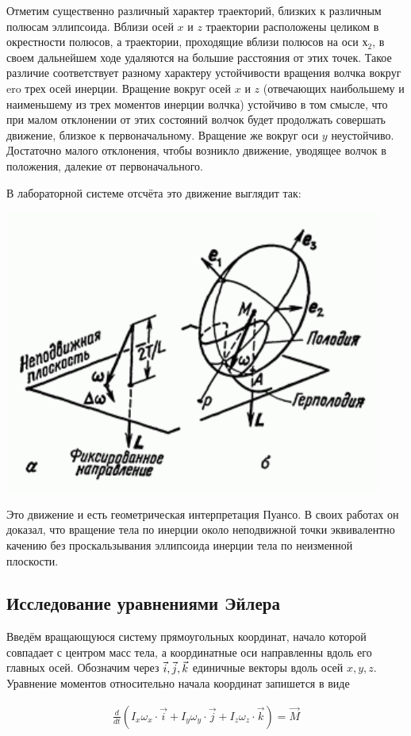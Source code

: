 \documentclass{article}
\begin{document}
Отметим существенно различный характер траекторий, близких к различным полюсам эллипсоида. Вблизи осей $x$ и $z$ траектории расположены целиком в окрестности полюсов, а траектории, проходящие вблизи полюсов на оси $х_2$, в своем дальнейшем ходе удаляются на большие расстояния от этих точек. Такое различие соответствует разному  характеру устойчивости вращения волчка вокруг ero трех осей инерции. Вращение вокруг осей $x$ и $z$ (отвечающих наибольшему и наименьшему из трех моментов инерции волчка) устойчиво в том смысле, что при малом отклонении от этих состояний волчок будет продолжать совершать движение, близкое к первоначальному. Вращение же вокруг оси $y$ неустойчиво. Достаточно малого отклонения, чтобы возникло движение, уводящее волчок в положения, далекие от первоначального.

В лабораторной системе отсчёта это движение выглядит так:

\begin{center}
\includegraphics[width=0.5\linewidth]{LSO.png}
\end{center}

Это движение и есть геометрическая интерпретация Пуансо. В своих работах он доказал, что вращение тела по инерции около неподвижной точки эквивалентно качению без проскальзывания эллипсоида инерции тела по неизменной плоскости.

\subsection{Исследование уравнениями Эйлера}

Введём вращающуюся систему прямоугольных координат, начало которой совпадает с центром масс тела, а координатные оси направленны вдоль его главных осей. Обозначим через $\vec{i}, \space \vec{j}, \space \vec{k}$ единичные векторы вдоль осей $x, y, z$. Уравнение моментов относительно начала координат запишется в виде 

\begin{equation} 
\begin{gathered}
\label{(7)}
\frac{d}{dt}(I_x\omega_x\cdot\vec{i}+I_y\omega_y\cdot\vec{j}+I_z\omega_z\cdot\vec{k}) = \vec{M}
\end{gathered}
\end{equation}
\end{document}
